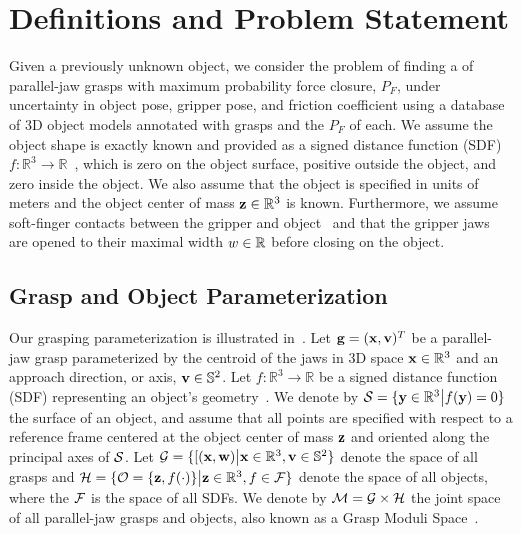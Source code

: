 \section{Definitions and Problem Statement}

Given a previously unknown object, we consider the problem of finding a of parallel-jaw grasps with maximum probability force closure, $P_F$, under uncertainty in object pose, gripper pose, and friction coefficient using a database of 3D object models annotated with grasps and the $P_F$ of each.
We assume the object shape is exactly known and provided as a signed distance function (SDF) $f: \mathbb{R}^3 \rightarrow \mathbb{R}$~\cite{mahler2015gp, newcombe2011kinectfusion}, which is zero on the object surface, positive outside the object, and zero inside the object. 
We also assume that the object is specified in units of meters and the object center of mass $\mathbf{z} \in \mathbb{R}^3$ is known.
Furthermore, we assume soft-finger contacts between the gripper and object~\cite{zheng2005} and that the gripper jaws are opened to their maximal width $w \in\mathbb{R}$ before closing on the object.

\subsection{Grasp and Object Parameterization}
Our grasping parameterization is illustrated in~.
Let $\mathbf{g} = (\mathbf{x}, \mathbf{v})^T$ be a parallel-jaw grasp parameterized by the centroid of the jaws in 3D space $\mathbf{x} \in \mathbb{R}^3$ and an approach direction, or axis, $\mathbf{v} \in \mathbb{S}^2$.
Let $f: \mathbb{R}^3 \rightarrow \mathbb{R}$ be a signed distance function (SDF) representing an object's geometry~\cite{mahler2015gp, newcombe2011kinectfusion}.
We denote by $\mathcal{S} = \{\mathbf{y} \in \mathbb{R}^3 \big| f(\mathbf{y}) = 0\}$ the surface of an object, and assume that all points are specified with respect to a reference frame centered at the object center of mass $\mathbf{z}$ and oriented along the principal axes of $\mathcal{S}$.
Let $\mathcal{G} = \{ [(\mathbf{x}, \mathbf{w}) \big| \mathbf{x} \in \mathbb{R}^3, \mathbf{v} \in \mathbb{S}^2\}$ denote the space of all grasps and $\mathcal{H} = \{ \mathcal{O} = \{\mathbf{z}, f(\cdot)\} \big|  \mathbf{z} \in \mathbb{R}^3, f \in \mathcal{F}\}$ denote the space of all objects, where the $\mathcal{F}$ is the space of all SDFs.
We denote by $\mathcal{M} = \mathcal{G} \times \mathcal{H}$ the joint space of all parallel-jaw grasps and objects, also known as a Grasp Moduli Space~\cite{pokorny2013grasp}.

